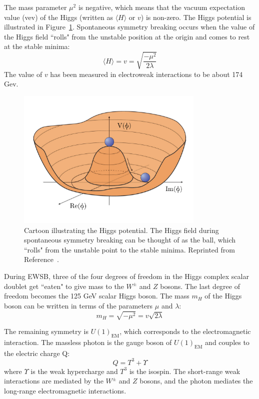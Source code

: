 The mass parameter $\mu^2$ is negative, which means that the vacuum expectation value (vev) of the Higgs (written as $\langle H \rangle$ or $v$) is non-zero. The Higgs potential is illustrated in Figure~\ref{fig:HiggsV}. Spontaneous symmetry breaking occurs when the value of the Higgs field ``rolls" from the unstable position at the origin and comes to rest at the stable minima:
\begin{equation}
\langle H \rangle= v = \sqrt{\frac{-\mu^2}{2\lambda}}
\end{equation}
The value of $v$ has been measured in electroweak interactions to be about 174 Gev. 

\begin{figure}[htbp]
    \centering
    \includegraphics[width=0.8\textwidth]{Figures/Theory/improvedMexicanHat.pdf}
    \caption{Cartoon illustrating the Higgs potential. The Higgs field during spontaneous symmetry breaking can be thought of as the ball, which ``rolls" from the unstable point to the stable minima.
    Reprinted from Reference~\cite{mexicanHat}.}
    \label{fig:HiggsV}
\end{figure}

During EWSB, three of the four degrees of freedom in the Higgs complex scalar doublet get ``eaten" to give mass to the $W^\pm$ and $Z$ bosons. The last degree of freedom becomes the 125 GeV scalar Higgs boson. The mass $m_H$ of the Higgs boson can be written in terms of the parameters $\mu$ and $\lambda$: 
\begin{equation}
m_H = \sqrt{-\mu^2} = v\sqrt{2\lambda}
\label{equ:HiggsMass}
\end{equation}

The remaining symmetry is $U(1)_{\textrm{EM}}$, which corresponds to the electromagnetic interaction. The massless photon is the gauge boson of $U(1)_{\textrm{EM}}$ and couples to the electric charge Q: 
\begin{equation}
Q = T^3 + \Upsilon
\end{equation}
where $\Upsilon$ is the weak hypercharge and $T^3$ is the isospin. The short-range weak interactions are mediated by the $W^\pm$ and $Z$ bosons, and the photon mediates the long-range electromagnetic interactions.

